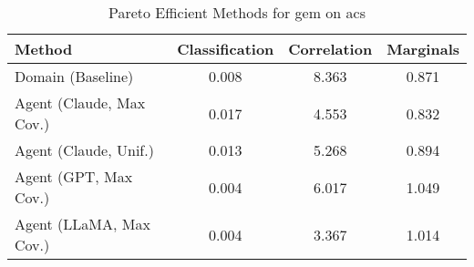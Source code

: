 \begin{table}[t!]
    \centering
    \caption{Pareto Efficient Methods for gem on acs}
    \label{tab:pareto_efficient_methods_gem_acs}
    \begin{tabular}{lccc}
    \toprule
    Method & Classification & Correlation & Marginals \\
    \midrule
    Domain (Baseline) & \cellcolor{bronze!30}0.008 & 8.363 & \cellcolor{silver!30}0.871 \\
    Agent (Claude, Max Cov.) & 0.017 & \cellcolor{silver!30}4.553 & \cellcolor{gold!30}0.832 \\
    Agent (Claude, Unif.) & 0.013 & \cellcolor{bronze!30}5.268 & \cellcolor{bronze!30}0.894 \\
    Agent (GPT, Max Cov.) & \cellcolor{gold!30}0.004 & 6.017 & 1.049 \\
    Agent (LLaMA, Max Cov.) & \cellcolor{silver!30}0.004 & \cellcolor{gold!30}3.367 & 1.014 \\
    \bottomrule
    \end{tabular}
\end{table}